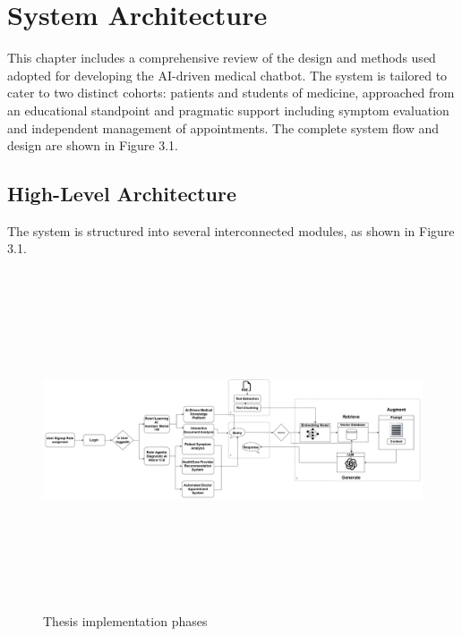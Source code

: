 \chapter{System Architecture}
\label{chap:design_methodology}

This chapter includes a comprehensive review of the design and methods used adopted for developing the AI-driven medical chatbot. The system is tailored to cater to two distinct cohorts: patients and students of medicine, approached from an educational standpoint and pragmatic support including symptom evaluation and independent management of appointments. The complete system flow and design are shown in Figure 3.1.

\section{High-Level Architecture}
\label{sec:high_level_architecture}

The system is structured into several interconnected modules, as shown in Figure 3.1.
\begin{figure}[htbp]
    \begin{center}
      \includegraphics[width=16cm,height=10cm]{./Images/Thesis.png}
       \caption{Thesis implementation phases}
       \label{fig: Thesis implementation phases}
    \end{center}
\end{figure}

